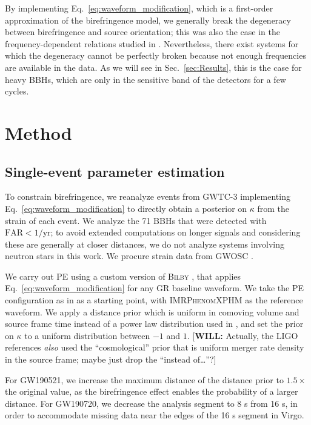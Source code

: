 \documentclass[aps,prd,twocolumn,superscriptaddress,preprintnumbers,floatfix,nofootinbib]{revtex4-2}
\newcommand*{\wf}[1]{\textsf{\color{cyan} [\textbf{WILL:} #1]}}
\begin{document}
By implementing Eq.~\eqref{eq:waveform_modification}, which is a first-order approximation of the birefringence model, we generally break the degeneracy between birefringence and source orientation; this was also the case in the frequency-dependent relations studied in \cite{Yamada_2020,Wang_2021}.
Nevertheless, there exist systems for which the degeneracy cannot be perfectly broken because not enough frequencies are available in the data.
As we will see in Sec.~\ref{sec:Results}, this is the case for heavy \acp{BBH}, which are only in the sensitive band of the detectors for a few cycles.

\section{Method}
\label{sec:Method}

\subsection{Single-event parameter estimation}

To constrain birefringence, we reanalyze events from GWTC-3 \citep{GWTC-2.1, GWTC-3} implementing Eq.~\eqref{eq:waveform_modification} to directly obtain a posterior on $\kappa$ from the strain of each event.
We analyze the 71 \acp{BBH} that were detected with $\mathrm{FAR} < 1/\mathrm{yr}$; to avoid extended computations on longer signals and considering these are generally at closer distances, we do not analyze systems involving neutron stars in this work.
We procure strain data from \ac{GWOSC} \citep{GWOSC}.

We carry out \ac{PE} using a custom version of \textsc{Bilby} \citep{Bilby},
that applies Eq.~\eqref{eq:waveform_modification} for any \ac{GR} baseline
waveform. We take the \ac{PE} configuration as in \citet{GWTC-2.1, GWTC-3,
GWTC-2.1_dataset, GWTC-3_dataset} as a starting point, with
\textsc{IMRPhenomXPHM} \citep{Pratten:2020ceb} as the reference waveform. We
apply a distance prior which is uniform in comoving volume and source frame time
instead of a power law distribution used in \citet{GWTC-2.1, GWTC-3,
GWTC-2.1_dataset, GWTC-3_dataset}, and set the prior on $\kappa$ to a uniform
distribution between $-1$ and $1$.  \wf{Actually, the LIGO references
\emph{also} used the ``cosmological'' prior that is uniform merger rate density
in the source frame; maybe just drop the ``instead of\ldots''?}

For GW190521, we increase the maximum distance of the distance prior to $1.5\times$ the original value, as the birefringence effect enables the probability of a larger distance.
For GW190720, we decrease the analysis segment to 8 s from 16 s, in order to accommodate missing data near the edges of the 16 s segment in Virgo.
\end{document}
